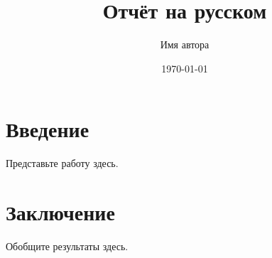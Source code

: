 \documentclass[12pt]{report}
\title{Отчёт на русском}
\author{Имя автора}
\date{\today}
\begin{document}
\maketitle
\tableofcontents

\chapter{Введение}
Представьте работу здесь.

\chapter{Заключение}
Обобщите результаты здесь.

% 
\end{document}
